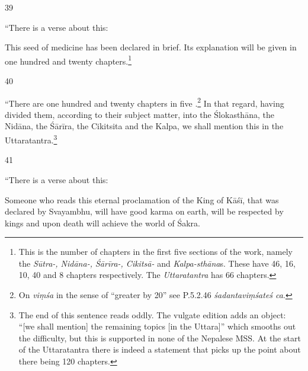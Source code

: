 \begin{translation}
    
    \item[39]
    
 “There is a verse about this:
    \begin{sloka}
        This seed of medicine has been declared in brief.  Its explanation will be given in one 
        hundred and twenty chapters.\footnote{This is the number of chapters in the first 
        five sections of the work, namely the  \emph{Sūtra-, Nidāna-, Śārīra-, Cikitsā-} 
        and \emph{Kalpa-sthāna}s. These have 46, 16, 10, 40 and 8 chapters respectively.  The 
        \emph{Uttaratantra} has 66 chapters.}
\end{sloka}


\item [40] 

“There are one hundred and twenty chapters in five
.\footnote{On \emph{viṃśa} in the sense of
    “greater by 20” see P.5.2.46 \emph{śadantaviṃśateś ca}.}  In that
    regard, having divided them, according to their subject matter, into
    the Ślokasthāna, the Nidāna, the Śārīra, the Cikitsita and the Kalpa,
    we shall mention this in the Uttaratantra.\footnote{The end of this
        sentence reads oddly.  The vulgate edition adds an object: “[we shall
        mention] the remaining topics [in the Uttara]” which smooths out the
        difficulty, but this is supported in none of the Nepalese MSS.  At
        the start of the Uttaratantra \citep[1.3--4ab]{vulgate} there is
        indeed a statement that picks up the point about there being 120
        chapters.}


\item[41]    

“There is a verse about this:
\begin{sloka}
    Someone who reads this eternal proclamation of the King of
    Kāśī, that was declared by Svayambhu, will have good karma on earth, will
    be respected by kings and upon death will achieve the world of Śakra.
\end{sloka}

\end{translation}    
